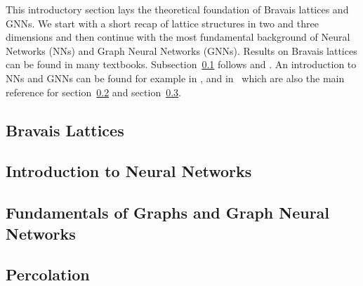 This introductory section lays the theoretical foundation of Bravais lattices and GNNs. 
We start with a short recap of lattice structures in two and three dimensions and then continue with 
the most fundamental background of Neural Networks (NNs) and Graph Neural Networks (GNNs).
Results on Bravais lattices can be found in many textbooks. Subsection~\ref{sec:brav_latt} follows \cite{Schwarzenberger} and \cite{symGroupsApplications}.
An introduction to NNs and GNNs can be found for example in \cite{bookNN1}, \cite{bookNN2} and in~\cite{IntroMessagePassing}
which are also the main reference for section~\ref{sec:intro_nn} and section~\ref{sec:fund_gnns}.

\subsection{Bravais Lattices}
\label{sec:brav_latt}


\subsection{Introduction to Neural Networks}
\label{sec:intro_nn}


\subsection{Fundamentals of Graphs and Graph Neural Networks}
\label{sec:fund_gnns}


\subsection{Percolation}
\label{sec:intro_percolation}
